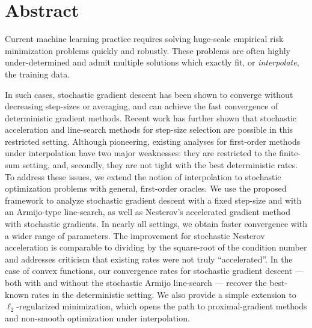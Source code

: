 
\chapter{Abstract}

Current machine learning practice requires solving huge-scale empirical risk minimization problems quickly and robustly. 
These problems are often highly under-determined and admit multiple solutions which exactly fit, or \emph{interpolate}, the training data. 

In such cases, stochastic gradient descent has been shown to converge without decreasing step-sizes or averaging, and can achieve the fast convergence of deterministic gradient methods. 
Recent work has further shown that stochastic acceleration and line-search methods for step-size selection are possible in this restricted setting.
Although pioneering, existing analyses for first-order methods under interpolation have two major weaknesses:
they are restricted to the finite-sum setting, and, secondly, they are not tight with the best deterministic rates. 
To address these issues, we extend the notion of interpolation to stochastic optimization problems with general, first-order oracles.
We use the proposed framework to analyze stochastic gradient descent with a fixed step-size and with an Armijo-type line-search, as well as Nesterov's accelerated gradient method with stochastic gradients.
In nearly all settings, we obtain faster convergence with a wider range of parameters. 
The improvement for stochastic Nesterov acceleration is comparable to dividing by the square-root of the condition number and addresses criticism that existing rates were not truly ``accelerated''. 
In the case of convex functions, our convergence rates for stochastic gradient descent --- both with and without the stochastic Armijo line-search --- recover the best-known rates in the deterministic setting.
We also provide a simple extension to \( \ell_2 \)-regularized minimization, which opens the path to proximal-gradient methods and non-smooth optimization under interpolation. 



